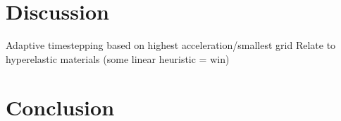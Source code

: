 \documentclass[11pt]{article}
\begin{document}
%


\section{Discussion}

Adaptive timestepping based on highest acceleration/smallest grid
Relate to hyperelastic materials (some linear heuristic = win)


\section{Conclusion}




\end{document}
